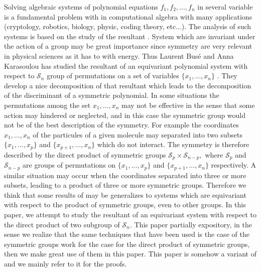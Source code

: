 \documentclass[12pt,a4paper,reqno]{amsart}
\theoremstyle{definition}
\theoremstyle{remark}
\numberwithin{equation}{section}
\begin{document}
Solving algebraic systems of  polynomial equations $f_1, f_2, \ldots,f_n$ in several variable is  a fundamental problem with in  computational algebra with many applications (cryptology, robotics, biology, physic, coding theory, etc...). The analysis of such systems is based on the study of the resultant \cite{Jou91}.  System which are invariant under the action of a group may be great importance since symmetry are very relevant in physical sciences as it has to with energy. Thus Laurent Bus\'e and Anna Karasoulou has studied the resultant of an equivariant polynomial system with respect to $\mathcal{S}_n$ group  of permutations  on a set of variables $ \{ x_1,\ldots,x_n \} $ \cite{BuKa16}. They develop a nice decomposition of that resultant which leads to the decomposition of the discriminant of a symmetric polynomial. In some situations the permutations among the set $x_1,\ldots,x_n$ may not be effective  in the sense that some action may hindered or neglected, and in this case the symmetric group would not be of the best description of the symmetry. For example the coordinates $x_1,\ldots,x_n$ of the particules of a given molecule may separated into two subsets $\{x_1, \ldots, x_p\}$ and $\{ x_{p+1}, \ldots, x_n\}$ which do not interact. The symmetry is therefore described by the direct product of symmetric groups $\mathcal{S}_p \times \mathcal{S}_{n-p},$ where $\mathcal{S}_p$ and $\mathcal{S}_{n-p}$  are groups of permutations on  $\{x_1, \ldots, x_p\}$ and   $\{ x_{p+1}, \ldots, x_n\}$ respectively. A similar situation may occur when the coordinates separated into three or more subsets, leading to a product of three or more symmetric groups. Therefore we think that some results of \cite{BuKa16} may be generalizes to systems which are equivariant with respect to the product of symmetric groups, even to other groups. In this paper, we attempt to study the resultant of  an equivariant system with respect  to the direct product of two subgroup of $\mathcal{S}_n.$ This paper partially expository, in the sense we realize that  the same techniques that have been used is the case of the symmetric groups \cite{BuKa16} work for the case for the direct product of symmetric groups, then we make great use of them in this paper. This paper is somehow a variant of \cite{BuKa16} and we mainly refer to it for the proofs.
\end{document}
